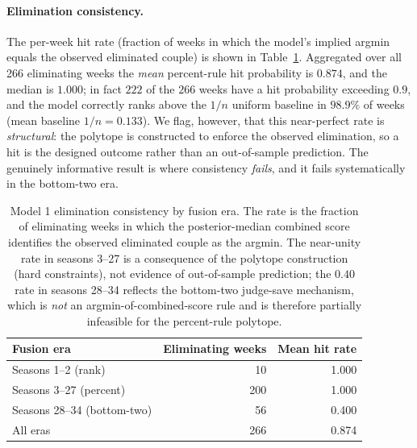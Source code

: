 \documentclass{article}
\begin{document}
\paragraph{Elimination consistency.} The per-week hit rate (fraction of weeks in which the
model's implied argmin equals the observed eliminated couple) is shown in
Table~\ref{tab:m1consist}. Aggregated over all 266 eliminating weeks the \emph{mean}
percent-rule hit probability is $0.874$, and the median is $1.000$; in fact $222$ of the
$266$ weeks have a hit probability exceeding $0.9$, and the model correctly ranks above
the $1/n$ uniform baseline in $98.9\%$ of weeks (mean baseline $1/n=0.133$). We flag,
however, that this near-perfect rate is \emph{structural}: the polytope is constructed to
enforce the observed elimination, so a hit is the designed outcome rather than an
out-of-sample prediction. The genuinely informative result is where consistency
\emph{fails}, and it fails systematically in the bottom-two era.

\begin{table}[H]
\centering
\caption{Model 1 elimination consistency by fusion era. The rate is the fraction of
eliminating weeks in which the posterior-median combined score identifies the observed
eliminated couple as the argmin. The near-unity rate in seasons 3--27 is a consequence of
the polytope construction (hard constraints), not evidence of out-of-sample prediction;
the $0.40$ rate in seasons 28--34 reflects the bottom-two judge-save mechanism, which is
\emph{not} an argmin-of-combined-score rule and is therefore partially infeasible for the
percent-rule polytope.}
\label{tab:m1consist}
\begin{tabular}{lrr}
\toprule
Fusion era & Eliminating weeks & Mean hit rate \\
\midrule
Seasons 1--2 (rank)            & 10  & 1.000 \\
Seasons 3--27 (percent)        & 200 & 1.000 \\
Seasons 28--34 (bottom-two)    & 56  & 0.400 \\
\midrule
All eras                       & 266 & 0.874 \\
\bottomrule
\end{tabular}
\end{table}
\end{document}
